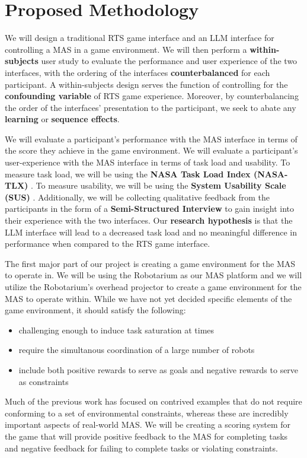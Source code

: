 \section{Proposed Methodology}

We will design a traditional RTS game interface and an LLM interface for controlling a MAS in a game environment.  We will then perform a \textbf{within-subjects} user study to evaluate the performance and user experience of the two interfaces, with the ordering of the interfaces \textbf{counterbalanced} for each participant.  A within-subjects design serves the function of controlling for the \textbf{confounding variable} of RTS game experience.  Moreover, by counterbalancing the order of the interfaces' presentation to the participant, we seek to abate any \textbf{learning} or \textbf{sequence effects}.

We will evaluate a participant's performance with the MAS interface in terms of the score they achieve in the game environment.  We will evaluate a participant's user-experience with the MAS interface in terms of task load and usability.  To measure task load, we will be using the \textbf{NASA Task Load Index (NASA-TLX)} \cite{hart_development_1988}.  To measure usability, we will be using the \textbf{System Usability Scale (SUS)} \cite{brooke_susa_1996}.  Additionally, we will be collecting qualitative feedback from the participants in the form of a \textbf{Semi-Structured Interview} to gain insight into their experience with the two interfaces.  Our \textbf{research hypothesis} is that the LLM interface will lead to a decreased task load and no meaningful difference in performance when compared to the RTS game interface.

The first major part of our project is creating a game environment for the MAS to operate in.  We will be using the Robotarium \cite{pickem_robotarium_2017} as our MAS platform and we will utilize the Robotarium's overhead projector to create a game environment for the MAS to operate within.  While we have not yet decided specific elements of the game environment, it should satisfy the following:\begin{itemize}[noitemsep, topsep=0pt]
    \item challenging enough to induce task saturation at times
    \item require the simultanous coordination of a large number of robots
    \item include both positive rewards to serve as goals and negative rewards to serve as constraints
\end{itemize}
Much of the previous work has focused on contrived examples that do not require conforming to a set of environmental constraints, whereas these are incredibly important aspects of real-world MAS.  We will be creating a scoring system for the game that will provide positive feedback to the MAS for completing tasks and negative feedback for failing to complete tasks or violating constraints.

